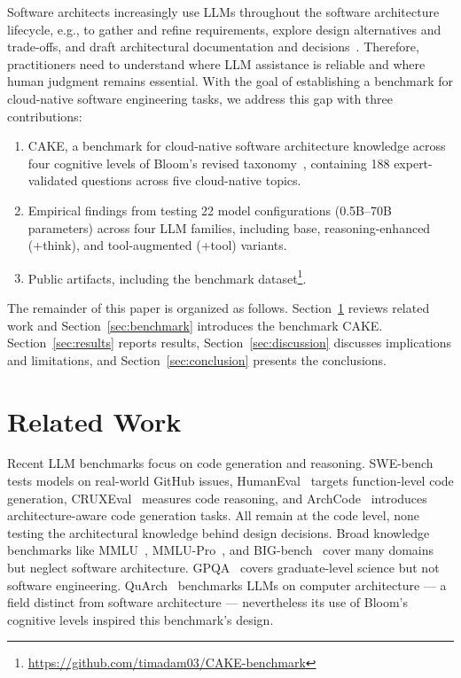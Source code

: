 \documentclass[conference]{IEEEtran}
\begin{document}
Software architects increasingly use LLMs throughout the software architecture lifecycle, e.g., to gather and refine requirements, explore design alternatives and trade-offs, and draft architectural documentation and decisions~\cite{b12}. Therefore, practitioners need to understand where LLM assistance is reliable and where human judgment remains essential.
With the goal of establishing a benchmark for cloud-native software engineering tasks, we address this gap with three contributions:
\begin{enumerate}
  \item CAKE, a benchmark for cloud-native software architecture knowledge across four cognitive levels of Bloom's revised taxonomy~\cite{b13}, containing 188 expert-validated questions across five cloud-native topics.
  \item Empirical findings from testing 22 model configurations (0.5B--70B parameters) across four LLM families, including base, reasoning-enhanced (+think), and tool-augmented (+tool) variants.
  \item Public artifacts, including the benchmark dataset\footnote{\url{https://github.com/timadam03/CAKE-benchmark}}.
\end{enumerate}


The remainder of this paper is organized as follows. Section~\ref{sec:related} reviews related work and Section~\ref{sec:benchmark} introduces the benchmark CAKE. Section~\ref{sec:results} reports results, Section~\ref{sec:discussion} discusses implications and limitations, and Section~\ref{sec:conclusion} presents the conclusions.


\section{Related Work}
\label{sec:related}
Recent LLM benchmarks focus on code generation and reasoning. SWE-bench~\cite{b1} tests models on real-world GitHub issues, HumanEval~\cite{b2} targets function-level code generation, CRUXEval~\cite{b4} measures code reasoning, and ArchCode~\cite{b3} introduces architecture-aware code generation tasks. All remain at the code level, none testing the architectural knowledge behind design decisions. Broad knowledge benchmarks like MMLU~\cite{b5}, MMLU-Pro~\cite{b25}, and BIG-bench~\cite{b6} cover many domains but neglect software architecture. GPQA~\cite{b7} covers graduate-level science but not software engineering. QuArch~\cite{b19} benchmarks LLMs on computer architecture — a field distinct from software architecture — nevertheless its use of Bloom's cognitive levels inspired this benchmark's design.
\end{document}
